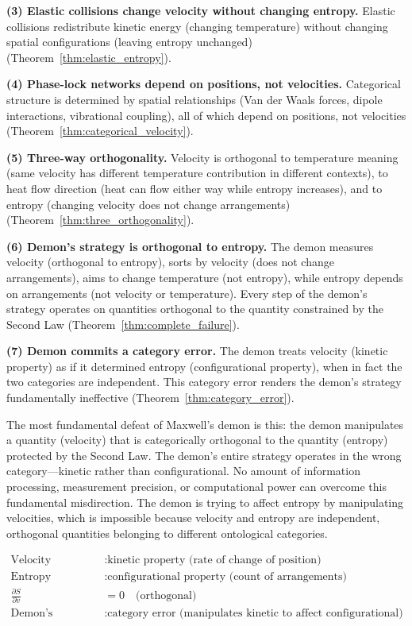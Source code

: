 \documentclass[12pt,a4paper]{article}
\theoremstyle{definition}
\theoremstyle{remark}
\begin{document}
\textbf{(3) Elastic collisions change velocity without changing entropy.} Elastic collisions redistribute kinetic energy (changing temperature) without changing spatial configurations (leaving entropy unchanged) (Theorem~\ref{thm:elastic_entropy}).

\textbf{(4) Phase-lock networks depend on positions, not velocities.} Categorical structure is determined by spatial relationships (Van der Waals forces, dipole interactions, vibrational coupling), all of which depend on positions, not velocities (Theorem~\ref{thm:categorical_velocity}).

\textbf{(5) Three-way orthogonality.} Velocity is orthogonal to temperature meaning (same velocity has different temperature contribution in different contexts), to heat flow direction (heat can flow either way while entropy increases), and to entropy (changing velocity does not change arrangements) (Theorem~\ref{thm:three_orthogonality}).

\textbf{(6) Demon's strategy is orthogonal to entropy.} The demon measures velocity (orthogonal to entropy), sorts by velocity (does not change arrangements), aims to change temperature (not entropy), while entropy depends on arrangements (not velocity or temperature). Every step of the demon's strategy operates on quantities orthogonal to the quantity constrained by the Second Law (Theorem~\ref{thm:complete_failure}).

\textbf{(7) Demon commits a category error.} The demon treats velocity (kinetic property) as if it determined entropy (configurational property), when in fact the two categories are independent. This category error renders the demon's strategy fundamentally ineffective (Theorem~\ref{thm:category_error}).

The most fundamental defeat of Maxwell's demon is this: the demon manipulates a quantity (velocity) that is categorically orthogonal to the quantity (entropy) protected by the Second Law. The demon's entire strategy operates in the wrong category—kinetic rather than configurational. No amount of information processing, measurement precision, or computational power can overcome this fundamental misdirection. The demon is trying to affect entropy by manipulating velocities, which is impossible because velocity and entropy are independent, orthogonal quantities belonging to different ontological categories.

\begin{equation}
\boxed{
\begin{aligned}
\text{Velocity} &: \text{kinetic property (rate of change of position)} \\
\text{Entropy} &: \text{configurational property (count of arrangements)} \\
\frac{\partial S}{\partial v} &= 0 \quad \text{(orthogonal)} \\
\text{Demon's strategy} &: \text{category error (manipulates kinetic to affect configurational)}
\end{aligned}
}
\end{equation}
\end{document}
